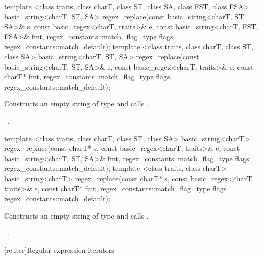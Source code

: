 %
\begin{itemdecl}
template <class traits, class charT, class ST, class SA, class FST, class FSA>
  basic_string<charT, ST, SA>
  regex_replace(const basic_string<charT, ST, SA>& s,
                const basic_regex<charT, traits>& e,
                const basic_string<charT, FST, FSA>& fmt,
                regex_constants::match_flag_type flags =
                  regex_constants::match_default); 
template <class traits, class charT, class ST, class SA>
  basic_string<charT, ST, SA>
  regex_replace(const basic_string<charT, ST, SA>& s,
                const basic_regex<charT, traits>& e,
                const charT* fmt,
                regex_constants::match_flag_type flags =
                  regex_constants::match_default);
\end{itemdecl}

\begin{itemdescr}
\pnum\effects  Constructs an empty string  of
type  and calls 
.

\pnum
\returns\ .
\end{itemdescr}

%
\begin{itemdecl}
template <class traits, class charT, class ST, class SA>
  basic_string<charT>
  regex_replace(const charT* s,
                const basic_regex<charT, traits>& e,
                const basic_string<charT, ST, SA>& fmt,
                regex_constants::match_flag_type flags =
                  regex_constants::match_default);
template <class traits, class charT>
  basic_string<charT>
  regex_replace(const charT* s,
                const basic_regex<charT, traits>& e,
                const charT* fmt,
                regex_constants::match_flag_type flags =
                  regex_constants::match_default);
\end{itemdecl}

\begin{itemdescr}
\pnum
\effects  Constructs an empty string  of
type  and calls 
.

\pnum
\returns\ .
\end{itemdescr}

[re.iter]{Regular expression iterators}

